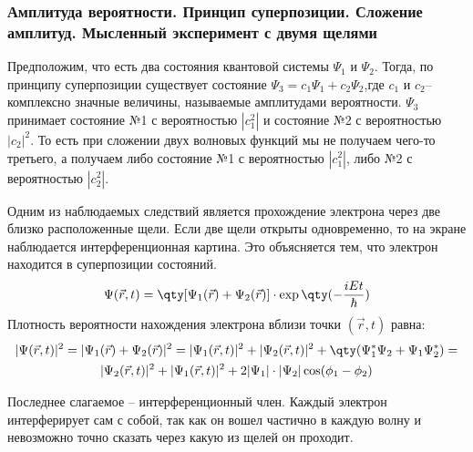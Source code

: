 \subsubsection{Амплитуда вероятности. Принцип суперпозиции. Сложение амплитуд. Мысленный эксперимент с двумя щелями}

Предположим, что есть два состояния квантовой системы $\Psi_1$ и $\Psi_2$.
Тогда, по принципу суперпозиции существует состояние $\Psi_3=c_1\Psi_1+c_2\Psi_2$,где
$c_1$ и  $c_2$-- комплексно значные величины, называемые амплитудами вероятности. $\Psi_3$ принимает состояние №1 с вероятностью $|c_1^2|$ и состояние №2 с вероятностью $|c_2|^2$. То есть при сложении двух волновых функций мы не получаем чего-то третьего, а получаем либо состояние №1 с вероятностью $|c_1^2|$, либо №2 с вероятностью $|c_2^2|$.

Одним из наблюдаемых следствий является прохождение электрона через две близко расположенные щели. Если две щели открыты одновременно, то на экране наблюдается интерференционная картина. Это объясняется тем, что электрон находится в суперпозиции состояний.
\begin{equation}
	\Psi(\vec{r},t)=\qty[\Psi_1(\vec{r})+\Psi_2(\vec{r})]\cdot\exp\qty(-\frac{iEt}{\hbar})
\end{equation}
Плотность вероятности нахождения электрона вблизи точки $(\vec{r},t)$ равна:
\begin{gather*}
	|\Psi(\vec{r},t)|^2=|\Psi_1(\vec{r})+\Psi_2(\vec{r})|^2=|\Psi_1(\vec{r},t)|^2+
	|\Psi_2(\vec{r},t)|^2+\qty(\Psi_1^*\Psi_2+\Psi_1\Psi_2^*)=\\
	|\Psi_2(\vec{r},t)|^2+|\Psi_1(\vec{r},t)|^2+2|\Psi_1|\cdot|\Psi_2|\cos(\phi_1-\phi_2)
\end{gather*}

Последнее слагаемое -- интерференционный член. Каждый электрон интерферирует сам  с собой, так как он вошел частично в каждую волну и невозможно точно сказать через какую из щелей он проходит.